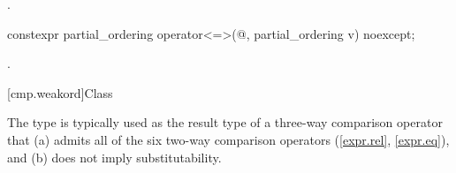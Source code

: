 \begin{itemdescr}
\pnum
\returns
{}.
\end{itemdescr}

%
\begin{itemdecl}
constexpr partial_ordering operator<=>(@\unspec@, partial_ordering v) noexcept;
\end{itemdecl}

\begin{itemdescr}
\pnum
\returns
{}.
\end{itemdescr}

[cmp.weakord]{Class }

\pnum
The  type is typically used
as the result type of a three-way comparison operator
that (a) admits all of the six two-way comparison operators (\ref{expr.rel}, \ref{expr.eq}),
and (b) does not imply substitutability.

